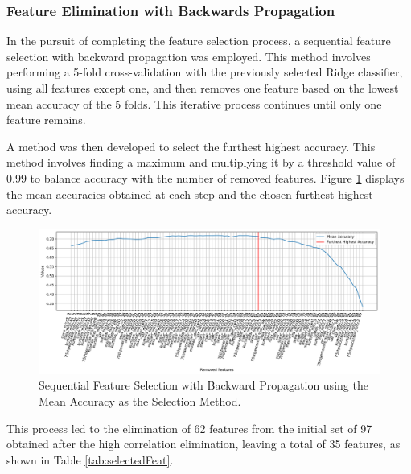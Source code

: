 \subsubsection{Feature Elimination with Backwards Propagation}

In the pursuit of completing the feature selection process, a sequential feature selection with backward propagation was employed. This method involves performing a 5-fold cross-validation with the previously selected Ridge classifier, using all features except one, and then removes one feature based on the lowest mean accuracy of the 5 folds. This iterative process continues until only one feature remains.

A method was then developed to select the furthest highest accuracy. This method involves finding a maximum and multiplying it by a threshold value of $0.99$ to balance accuracy with the number of removed features. Figure \ref{fig:backProp1} displays the mean accuracies obtained at each step and the chosen furthest highest accuracy.

\begin{figure}[H]
	\centering
	\includegraphics[width=1\linewidth]{figs/4_1_traditional/backProp1.png}
	\caption{Sequential Feature Selection with Backward Propagation using the Mean Accuracy as the Selection Method.}
	\label{fig:backProp1}
\end{figure}

This process led to the elimination of 62 features from the initial set of 97 obtained after the high correlation elimination, leaving a total of 35 features, as shown in Table \ref{tab:selectedFeat}.

